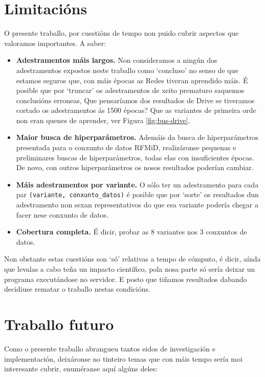 \section{Limitacións}
\label{sec:limitacions}

O presente traballo, por cuestións de tempo non puido cubrir aspectos que valoramos importantes. A saber:
\begin{itemize}
				\item \textbf{Adestramentos máis largos.} Non consideramos a ningún dos adestramentos expostos neste traballo como `concluso' no senso de que estamos seguros que, con máis épocas as Redes tiveran aprendido máis. É posible que por `truncar' os adestramentos de xeito prematuro saquemos conclusións erroneas, Que pensaríamos dos resultados de Drive se tiveramos cortado os adestramentos ás 1500 épocas? Que as variantes de primeira orde non eran quenes de aprender, ver Figura \ref{fig:bus-drive}.
				\item \textbf{Maior busca de hiperparámetros.} Ademáis da busca de hiperparámetros presentada para o conxunto de datos RFMiD, realizáronse pequenas e preliminares buscas de hiperparámetros, todas elas con insuficientes épocas. De novo, con outros hiperparámetros os nosos resultados poderían cambiar.
				\item \textbf{Máis adestramentos por variante.} O sólo ter un adestramento para cada par \texttt{(variante, conxunto\_datos)} é posible que por `sorte' os resultados dun adestramento non sexan representativos do que esa variante podería chegar a facer nese conxunto de datos.
				\item \textbf{Cobertura completa.} É dicir, probar as 8 variantes nos 3 conxuntos de datos.
\end{itemize}

Non obstante estas cuestións son `só' relativas a tempo de cómputo, é dicir, aínda que levalas a cabo teña un impacto científico, pola nosa parte só sería deixar un programa executándose no servidor. E posto que tiñamos resultados dabando decidiuse rematar o traballo nestas condicións.

\section{Traballo futuro}
\label{sec:traballofuturo}

Como o presente traballo abrangueu tantos eidos de investigación e implementación, deixáronse no tinteiro temas que con máis tempo sería moi interesante cubrir, enuméranse aquí algúns deles:

